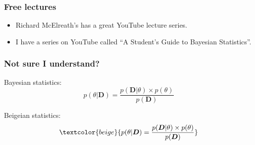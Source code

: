 \documentclass[handout]{beamer}
\begin{document}
\begin{frame}
	\frametitle{Free lectures}
	
	\begin{itemize}
		\item Richard McElreath's has a great YouTube lecture series.
		\item I have a series on YouTube called ``A Student's Guide to Bayesian Statistics''.
	\end{itemize}
	
\end{frame}


\begin{frame}
	\frametitle{Not sure I understand?}
	
	 Bayesian statistics:{
		\begin{equation}
		p(\theta|\boldsymbol{D}) = \frac{p(\boldsymbol{D}|\theta)\times p(\theta)}{p(\boldsymbol{D})}
		\end{equation}}
	
	 Beigeian statistics:{
		\begin{equation}
		\textcolor{beige}{p(\theta|\boldsymbol{D}) = \frac{p(\boldsymbol{D}|\theta)\times p(\theta)}{p(\boldsymbol{D})}}
		\end{equation}}
	
\end{frame}
\end{document}

